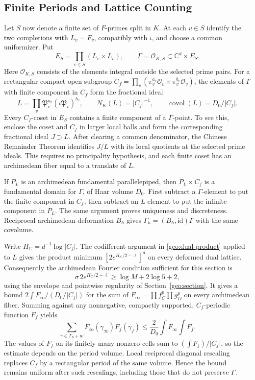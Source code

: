\subsection{Finite Periods and Lattice Counting}

Let $S$ now denote a finite set of $F$-primes split in $K$. At each
$v\in S$ identify the two completions with $L_v=F_v$, compatibly with
$\iota$, and choose a common uniformizer. Put
\[
 E_S=\prod_{v\in S}(L_v\times L_v),\qquad
 \Gamma=\mathcal O_{K,S}\subset\mathbb C^d\times E_S.
\]
Here $\mathcal O_{K,S}$ consists of the elements integral outside the
selected prime pairs. For a rectangular compact open subgroup
$C_f=\prod_v(\pi_v^{a_v}\mathcal O_v\times\pi_v^{b_v}\mathcal O_v)$,
the elements of $\Gamma$ with finite component in $C_f$ form the fractional
ideal
\[
 L=\prod_v\mathfrak P_v^{a_v}(\iota\mathfrak P_v)^{b_v},\qquad
 N_K(L)=|C_f|^{-1},\qquad \operatorname{covol}(L)=D_0/|C_f|.
\]
Every $C_f$-coset in $E_S$ contains a finite component of a $\Gamma$-point.
To see this, enclose the coset and $C_f$ in larger local balls and form
the corresponding fractional ideal $J\supset L$. After clearing a common
denominator, the Chinese Remainder Theorem identifies $J/L$ with its
local quotients at the selected prime ideals. This requires no
principality hypothesis, and each finite coset has an archimedean fiber
equal to a translate of $L$.

If $P_L$ is an archimedean fundamental parallelepiped, then $P_L\times C_f$
is a fundamental domain for $\Gamma$, of Haar volume $D_0$. First subtract
a $\Gamma$-element to put the finite component in $C_f$, then subtract an
$L$-element to put the infinite component in $P_L$. The same argument
proves uniqueness and discreteness. Reciprocal archimedean deformation
$B_h$ gives $\Gamma_h=(B_h,\mathrm{id})\Gamma$ with the same covolume.

Write $H_C=d^{-1}\log|C_f|$. The codifferent argument in
\eqref{geo:dual-product} applied to $L$ gives the product minimum
$[2e^{H_C/2-\ell}]^d$ on every deformed dual lattice. Consequently the
archimedean Fourier condition sufficient for this section is
\begin{equation}\label{fw:fourier-condition}
 \sigma\,2e^{H_C/2-\ell}\ge\log M+2\log5+2,
\end{equation}
using the envelope and pointwise regularity of Section~\ref{geo:section}.
It gives a bound $2\int F_\infty/(D_0/|C_f|)$ for the sum of
$F_\infty=\prod f_C^p\prod g_D^p$ on every archimedean fiber.
Summing against any nonnegative, compactly supported, $C_f$-periodic
function $F_f$ yields
\begin{equation}\label{fw:weighted-count}
 \sum_{\gamma\in\Gamma_h+w}F_\infty(\gamma_\infty)F_f(\gamma_f)
 \le\frac2{D_0}\int F_\infty\int F_f.
\end{equation}
The values of $F_f$ on its finitely many nonzero cells sum to
$(\int F_f)/|C_f|$, so the estimate depends on the period volume.
Local reciprocal diagonal rescaling replaces $C_f$ by a rectangular
period of the same volume. Hence the bound remains uniform after such
rescalings, including those that do not preserve $\Gamma$.

